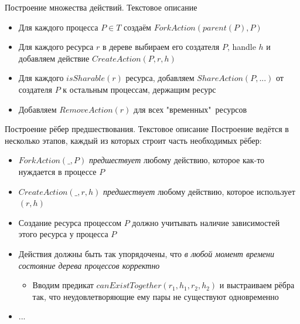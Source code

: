 \begin{frame}{Построение множества действий. Текстовое описание}
\begin{itemize}
	\item Для каждого процесса $P \in T$ создаём $ForkAction(parent(P), P)$
	\item Для каждого ресурса $r$ в дереве выбираем его создателя $P$, handle $h$ и добавляем действие $CreateAction(P, r, h)$
	\item Для каждого $isSharable(r)$ ресурса, добавляем $ShareAction(P,...)$ от создателя $P$ к остальным процессам, держащим ресурс
	\item Добавляем $RemoveAction(r)$ для всех "временных"\ ресурсов
\end{itemize}
\end{frame}

\begin{frame}{Построение рёбер предшествования. Текстовое описание}
Построение ведётся в несколько этапов, каждый из которых строит часть необходимых рёбер:
\begin{itemize}
	\item $ForkAction(\_, P)$ \emph{предшествует} любому действию, которое как-то нуждается в процессе $P$
	\item $CreateAction(\_, r, h)$ \emph{предшествует} любому действию, которое использует $(r, h)$ 
	\item Создание ресурса процессом $P$ должно \alert{учитывать наличие зависимостей} этого ресурса у процесса $P$
	\item Действия должны быть так упорядочены, что \emph{в любой момент времени состояние дерева процессов корректно}
		\begin{itemize}
			\item Вводим предикат \alert{$canExistTogether(r_1, h_1, r_2, h_2)$} и выстраиваем рёбра так, что неудовлетворяющие ему пары не существуют одновременно
		\end{itemize}
	\item ...
\end{itemize}
\end{frame}



